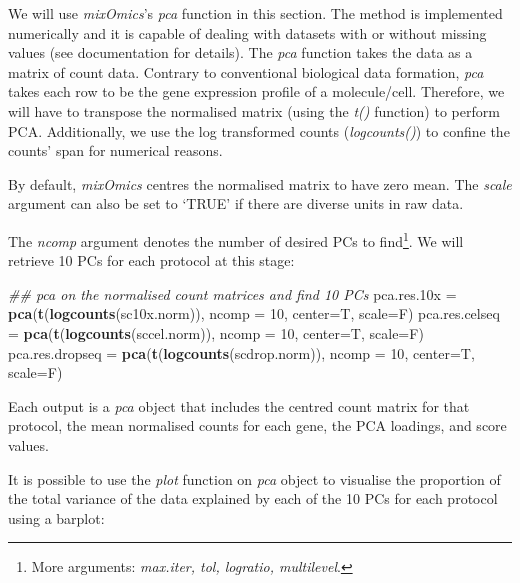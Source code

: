 \documentclass[]{book}
\newenvironment{Shaded}{\begin{snugshade}}{\end{snugshade}}
\newcommand{\CommentTok}[1]{\textcolor[rgb]{0.56,0.35,0.01}{\textit{#1}}}
\newcommand{\DataTypeTok}[1]{\textcolor[rgb]{0.13,0.29,0.53}{#1}}
\newcommand{\DecValTok}[1]{\textcolor[rgb]{0.00,0.00,0.81}{#1}}
\newcommand{\FloatTok}[1]{\textcolor[rgb]{0.00,0.00,0.81}{#1}}
\newcommand{\KeywordTok}[1]{\textcolor[rgb]{0.13,0.29,0.53}{\textbf{#1}}}
\newcommand{\NormalTok}[1]{#1}
\newcommand{\StringTok}[1]{\textcolor[rgb]{0.31,0.60,0.02}{#1}}
\let\rmarkdownfootnote\footnote%
\def\footnote{\protect\rmarkdownfootnote}
\theoremstyle{definition}
\theoremstyle{definition}
\theoremstyle{definition}
\theoremstyle{remark}
\begin{document}
We will use \emph{mixOmics}'s \emph{pca} function in this section. The
method is implemented numerically and it is capable of dealing with
datasets with or without missing values (see documentation for details).
The \emph{pca} function takes the data as a matrix of count data.
Contrary to conventional biological data formation, \emph{pca} takes
each row to be the gene expression profile of a molecule/cell.
Therefore, we will have to transpose the normalised matrix (using the
\emph{t()} function) to perform PCA. Additionally, we use the log
transformed counts (\emph{logcounts()}) to confine the counts' span for
numerical reasons.

By default, \emph{mixOmics} centres the normalised matrix to have zero
mean. The \emph{scale} argument can also be set to `TRUE' if there are
diverse units in raw data.

The \emph{ncomp} argument denotes the number of desired PCs to
find\footnote{More arguments: \emph{max.iter, tol, logratio,
  multilevel}.}. We will retrieve 10 PCs for each protocol at this
stage:

\begin{Shaded}
\begin{Highlighting}[]
\CommentTok{## pca on the normalised count matrices and find 10 PCs}
\NormalTok{pca.res}\FloatTok{.10}\NormalTok{x =}\StringTok{     }\KeywordTok{pca}\NormalTok{(}\KeywordTok{t}\NormalTok{(}\KeywordTok{logcounts}\NormalTok{(sc10x.norm)),  }\DataTypeTok{ncomp =} \DecValTok{10}\NormalTok{,}
                      \DataTypeTok{center=}\NormalTok{T, }\DataTypeTok{scale=}\NormalTok{F)}
\NormalTok{pca.res.celseq =}\StringTok{  }\KeywordTok{pca}\NormalTok{(}\KeywordTok{t}\NormalTok{(}\KeywordTok{logcounts}\NormalTok{(sccel.norm)),  }\DataTypeTok{ncomp =} \DecValTok{10}\NormalTok{,}
                      \DataTypeTok{center=}\NormalTok{T, }\DataTypeTok{scale=}\NormalTok{F)}
\NormalTok{pca.res.dropseq =}\StringTok{ }\KeywordTok{pca}\NormalTok{(}\KeywordTok{t}\NormalTok{(}\KeywordTok{logcounts}\NormalTok{(scdrop.norm)), }\DataTypeTok{ncomp =} \DecValTok{10}\NormalTok{,}
                      \DataTypeTok{center=}\NormalTok{T, }\DataTypeTok{scale=}\NormalTok{F)}
\end{Highlighting}
\end{Shaded}

Each output is a \emph{pca} object that includes the centred count
matrix for that protocol, the mean normalised counts for each gene, the
PCA loadings, and score values.

It is possible to use the \emph{plot} function on \emph{pca} object to
visualise the proportion of the total variance of the data explained by
each of the 10 PCs for each protocol using a barplot:
\end{document}
